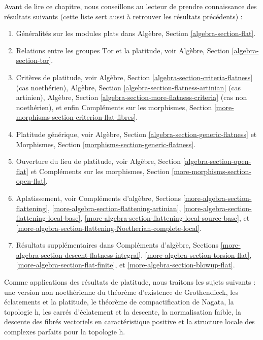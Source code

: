 \medskip\noindent
Avant de lire ce chapitre, nous conseillons au lecteur de prendre connaissance
des résultats suivants (cette liste sert aussi à retrouver
les résultats précédents) :
\begin{enumerate}
\item Généralités sur les modules plats dans
Algèbre, Section \ref{algebra-section-flat}.
\item Relations entre les groupes $\text{Tor}$ et la platitude, voir
Algèbre, Section \ref{algebra-section-tor}.
\item Critères de platitude, voir
Algèbre, Section \ref{algebra-section-criteria-flatness}
(cas noethérien),
Algèbre, Section \ref{algebra-section-flatness-artinian}
(cas artinien),
Algèbre, Section \ref{algebra-section-more-flatness-criteria}
(cas non noethérien), et enfin
Compléments sur les morphismes, Section \ref{more-morphisms-section-criterion-flat-fibres}.
\item Platitude générique, voir
Algèbre, Section \ref{algebra-section-generic-flatness}
et
Morphismes, Section \ref{morphisms-section-generic-flatness}.
\item Ouverture du lieu de platitude, voir
Algèbre, Section \ref{algebra-section-open-flat}
et
Compléments sur les morphismes, Section \ref{more-morphisms-section-open-flat}.
\item Aplatissement, voir
Compléments d'algèbre, Sections\newline
\ref{more-algebra-section-flattening},
\ref{more-algebra-section-flattening-artinian},
\ref{more-algebra-section-flattening-local-base},
\ref{more-algebra-section-flattening-local-source-base}, et
\ref{more-algebra-section-flattening-Noetherian-complete-local}.
\item Résultats supplémentaires dans
Compléments d'algèbre, Sections \ref{more-algebra-section-descent-flatness-integral},
\ref{more-algebra-section-torsion-flat},
\ref{more-algebra-section-flat-finite}, et
\ref{more-algebra-section-blowup-flat}.
\end{enumerate}
Comme applications des résultats de platitude, nous traitons les sujets
suivants : une version non noethérienne du théorème d'existence de Grothendieck,
les éclatements et la platitude, le théorème de compactification de Nagata,
la topologie h, les carrés d'éclatement et la descente, la normalisation faible,
la descente des fibrés vectoriels en caractéristique positive et
la structure locale des complexes parfaits pour la topologie h.






